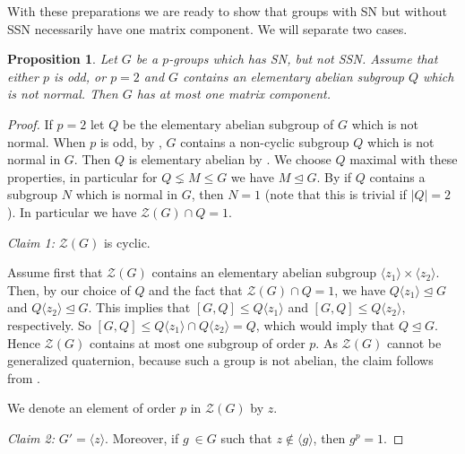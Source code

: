 \documentclass[a4paper,10pt]{amsart}
\newtheorem{proposition}[lemma]{Proposition}
\theoremstyle{definition}
\theoremstyle{remark}
\newcommand{\ZZ}{\mathcal{Z}}
\begin{document}
With these preparations we are ready to show that groups with SN but without SSN necessarily have one matrix component. We will separate two cases.

\begin{proposition}\label{prop:OddPGroups}
Let $G$ be a $p$-groups which has SN, but not SSN. Assume that either $p$ is odd, or $p=2$ and $G$ contains an elementary abelian subgroup $Q$ which is not normal. Then $G$ has at most one matrix component.
\end{proposition}
\begin{proof}
If $p=2$ let $Q$ be the elementary abelian subgroup of $G$ which is not normal. When $p$ is odd, by , $G$ contains a non-cyclic subgroup $Q$ which is not normal in $G$. Then $Q$ is elementary abelian by . We choose $Q$ maximal with these properties, in particular for $Q \lneq M \leq G$ we have $M \unlhd G$. By  if $Q$ contains a subgroup $N$ which is normal in $G$, then $N = 1$ (note that this is trivial if $|Q| = 2$). In particular we have $\ZZ(G) \cap Q = 1$.

\textit{Claim 1:} $\ZZ(G)$ is cyclic. 

Assume first that $\ZZ(G)$ contains an elementary abelian subgroup $\langle z_1 \rangle \times \langle z_2 \rangle$. Then, by our choice of $Q$ and the fact that $\ZZ(G) \cap Q = 1$, we have $Q\langle z_1 \rangle \unlhd G$ and $Q\langle z_2 \rangle \unlhd G$. This implies that $[G,Q] \leq Q \langle z_1 \rangle$ and $[G,Q] \leq Q \langle z_2 \rangle$, respectively. So $[G,Q] \leq Q \langle z_1 \rangle \cap Q \langle z_2 \rangle = Q$, which would imply that $Q \unlhd G$. Hence $\ZZ(G)$ contains at most one subgroup of order $p$. As $\ZZ(G)$ cannot be generalized quaternion, because such a group is not abelian, the claim follows from .

We denote an element of order $p$ in $\ZZ(G)$ by $z$.

\textit{Claim 2:} $G' = \langle z \rangle$. Moreover, if $g\ \in G$ such that $z \notin \langle g \rangle$, then $g^p = 1$.


\end{proof}
\end{document}
